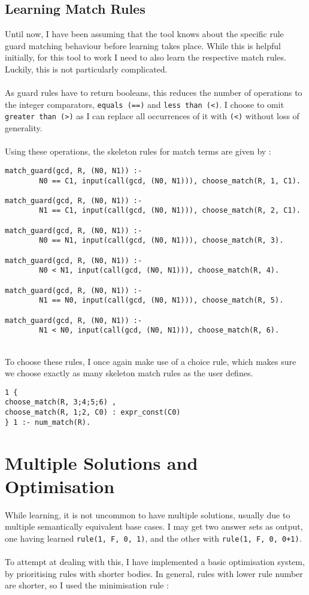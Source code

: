 \subsection{Learning Match Rules}
Until now, I have been assuming that the tool knows about the specific rule guard matching behaviour before learning takes place. While this is helpful initially, for this tool to work I need to also learn the respective match rules. Luckily, this is not particularly complicated. \\ \\
As guard rules have to return booleans, this reduces the number of operations to the integer comparators, \lstinline{equals (==)} and \lstinline{less than (<)}. I choose to omit \lstinline{greater than (>)} as I can replace all occurrences of it with \lstinline{(<)} without loss of generality.\\ \\
Using these operations, the skeleton rules for match terms are given by : \\

\begin{lstlisting}
match_guard(gcd, R, (N0, N1)) :- 
		N0 == C1, input(call(gcd, (N0, N1))), choose_match(R, 1, C1).
		
match_guard(gcd, R, (N0, N1)) :- 
		N1 == C1, input(call(gcd, (N0, N1))), choose_match(R, 2, C1).
		
match_guard(gcd, R, (N0, N1)) :- 
		N0 == N1, input(call(gcd, (N0, N1))), choose_match(R, 3).
		
match_guard(gcd, R, (N0, N1)) :- 
		N0 < N1, input(call(gcd, (N0, N1))), choose_match(R, 4).
		
match_guard(gcd, R, (N0, N1)) :- 
		N1 == N0, input(call(gcd, (N0, N1))), choose_match(R, 5).
		
match_guard(gcd, R, (N0, N1)) :- 
		N1 < N0, input(call(gcd, (N0, N1))), choose_match(R, 6).
\end{lstlisting}
\mbox{}\\
To choose these rules, I once again make use of a choice rule, which makes sure we choose exactly as many skeleton match rules as the user defines. \\

\begin{lstlisting}
1 {
choose_match(R, 3;4;5;6) ,
choose_match(R, 1;2, C0) : expr_const(C0)
} 1 :- num_match(R).
\end{lstlisting}

\section{Multiple Solutions and Optimisation}
While learning, it is not uncommon to have multiple solutions, usually due to multiple semantically equivalent base cases. I may get two answer sets as output, one having learned \lstinline{rule(1, F, 0, 1)}, and the other with \lstinline{rule(1, F, 0, 0+1)}. \\ \\
To attempt at dealing with this, I have implemented a basic optimisation system, by prioritising rules with shorter bodies. In general, rules with lower rule number are shorter, so I used the minimisation rule :

